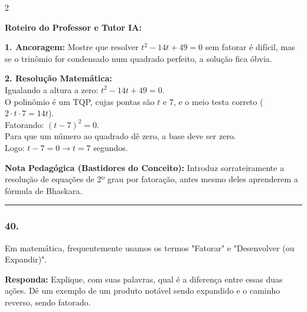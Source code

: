 \begin{multicols*}{2}
\ifgabarito
    \begin{tcolorbox}[colback=CorTitUm!5, colframe=CorTitUm, boxrule=1pt, arc=4pt, left=6pt, right=6pt, top=6pt, bottom=6pt]
    \small\textbf{\textcolor{CorTitUm}{Roteiro do Professor e Tutor IA:}}\par\vspace{0.1cm}
    \color{CinzaEscuro}
    \textbf{1. Ancoragem:} Mostre que resolver $t^2 - 14t + 49 = 0$ sem fatorar é difícil, mas se o trinômio for condensado num quadrado perfeito, a solução fica óbvia.\par\vspace{0.1cm}
    \textbf{2. Resolução Matemática:}\\
    Igualando a altura a zero: $t^2 - 14t + 49 = 0$.\\
    O polinômio é um TQP, cujas pontas são $t$ e $7$, e o meio testa correto ($2 \cdot t \cdot 7 = 14t$).\\
    Fatorando: $(t - 7)^2 = 0$.\\
    Para que um número ao quadrado dê zero, a base deve ser zero.\\
    Logo: $t - 7 = 0 \rightarrow t = 7$ segundos.
    \end{tcolorbox}
    \vspace{0.15cm}
    
    \begin{boxexplicacao}
    \textbf{Nota Pedagógica (Bastidores do Conceito):} Introduz sorrateiramente a resolução de equações de 2º grau por fatoração, antes mesmo deles aprenderem a fórmula de Bhaskara.
    \end{boxexplicacao}
\fi

\par\vspace{\espacoQuestao}

\noindent\textcolor{CorLinha}{\rule{\linewidth}{0.5pt}} 
\par\vspace{\espacoPreQuestao}
\subsubsection*{40.} 
\begin{enunciadoLiteral}
Em matemática, frequentemente usamos os termos "Fatorar" e "Desenvolver (ou Expandir)". 

\begin{boxresponda}
\textbf{Responda:} Explique, com suas palavras, qual é a diferença entre essas duas ações. Dê um exemplo de um produto notável sendo expandido e o caminho reverso, sendo fatorado.
\end{boxresponda}
\end{enunciadoLiteral}


\end{multicols*}
